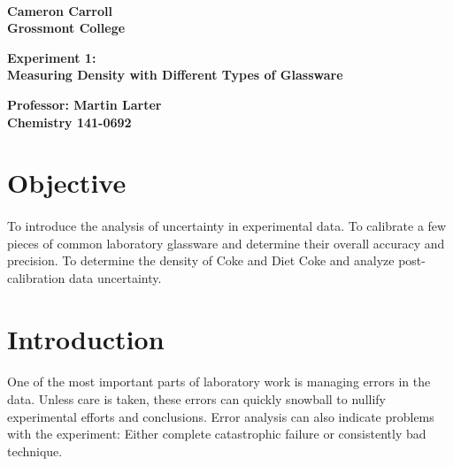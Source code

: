 \documentclass[fleqn,titlepage]{article}
\begin{document}
\begin{titlepage}
  \mbox{}\\[1.25cm]
  \textbf{\LARGE Cameron Carroll \\ Grossmont College}\\[2.25cm]
  \begin{center}
    \textbf{\huge Experiment 1: \\ Measuring Density with Different Types of Glassware}\\[2.50cm]
  \end{center}
  \textbf{\LARGE Professor: Martin Larter \\ Chemistry 141-0692}
  \vfill
\end{titlepage}

\section*{Objective}
  \paragraph{} To introduce the analysis of uncertainty in experimental data. To calibrate a few pieces of common laboratory glassware and determine their overall accuracy and precision. To determine the density of Coke and Diet Coke and analyze post-calibration data uncertainty.

\newpage
\section*{Introduction}
  \paragraph{} One of the most important parts of laboratory work is managing errors in the data. Unless care is taken, these errors can quickly snowball to nullify experimental efforts and conclusions. Error analysis can also indicate problems with the experiment: Either complete catastrophic failure or consistently bad technique.
\end{document}
